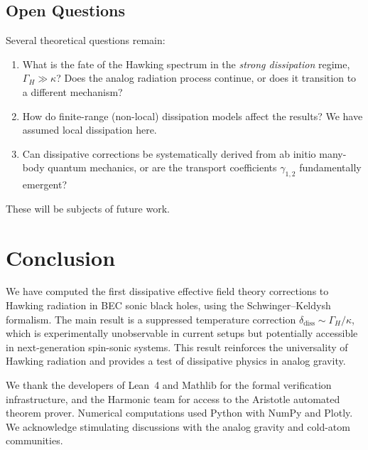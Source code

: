 \documentclass[aps,prl,twocolumn,superscriptaddress,nofootinbib,amsmath,amssymb]{revtex4-2}
\begin{document}
\subsection{Open Questions}

Several theoretical questions remain:
\begin{enumerate}
\item What is the fate of the Hawking spectrum in the \textit{strong dissipation} regime, $\Gamma_H \gg \kappa$? Does the analog radiation process continue, or does it transition to a different mechanism?
\item How do finite-range (non-local) dissipation models affect the results? We have assumed local dissipation here.
\item Can dissipative corrections be systematically derived from ab initio many-body quantum mechanics, or are the transport coefficients $\gamma_{1,2}$ fundamentally emergent?
\end{enumerate}

These will be subjects of future work.

\section{Conclusion}

We have computed the first dissipative effective field theory corrections to Hawking radiation in BEC sonic black holes, using the Schwinger--Keldysh formalism. The main result is a suppressed temperature correction $\delta_{\text{diss}} \sim \Gamma_H / \kappa$, which is experimentally unobservable in current setups but potentially accessible in next-generation spin-sonic systems. This result reinforces the universality of Hawking radiation and provides a test of dissipative physics in analog gravity.

\begin{acknowledgments}
We thank the developers of Lean~4 and Mathlib for the formal verification infrastructure, and the Harmonic team for access to the Aristotle automated theorem prover. Numerical computations used Python with NumPy and Plotly. We acknowledge stimulating discussions with the analog gravity and cold-atom communities.
\end{acknowledgments}
\end{document}
